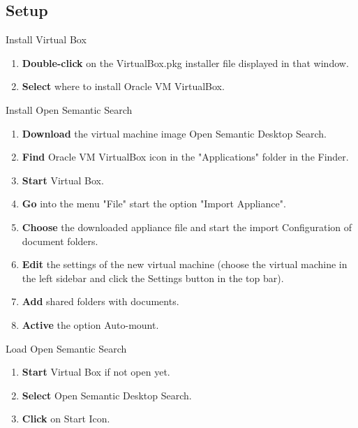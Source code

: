 \documentclass[10pt,a4paper]{article}
\begin{document}
\subsection{Setup}


\begin{textbox}{Install Virtual Box}
 

  


\begin{enumerate}
\item \textbf {Double-click} on the VirtualBox.pkg installer file displayed in that window.
\item \textbf {Select} where to install Oracle VM VirtualBox.

\end{enumerate}


\end{textbox}

\begin{textbox}{Install Open Semantic Search}
 

  

\begin{enumerate}
\item \textbf{Download} the virtual machine image Open Semantic Desktop Search. 
\item \textbf {Find} Oracle VM VirtualBox icon in the "Applications" folder in the Finder.
\item \textbf{Start} Virtual Box.
\item \textbf{Go} into the menu "File" start the option "Import Appliance".
\item \textbf{Choose} the downloaded appliance file and start the import Configuration of document folders.
\item \textbf{Edit} the settings of the new virtual machine (choose the virtual machine in the left sidebar and click the Settings button in the top bar).
\item \textbf{Add} shared folders with documents.
\item \textbf{Active} the option Auto-mount.
\end{enumerate}

\end{textbox}

\begin{textbox}{Load Open Semantic Search}
 

  

\begin{enumerate}
\item \textbf{Start} Virtual Box if not open yet.
\item \textbf{Select} Open Semantic Desktop Search.
\item \textbf{Click} on Start Icon. 
\end{enumerate}

\end{textbox}
\end{document}

